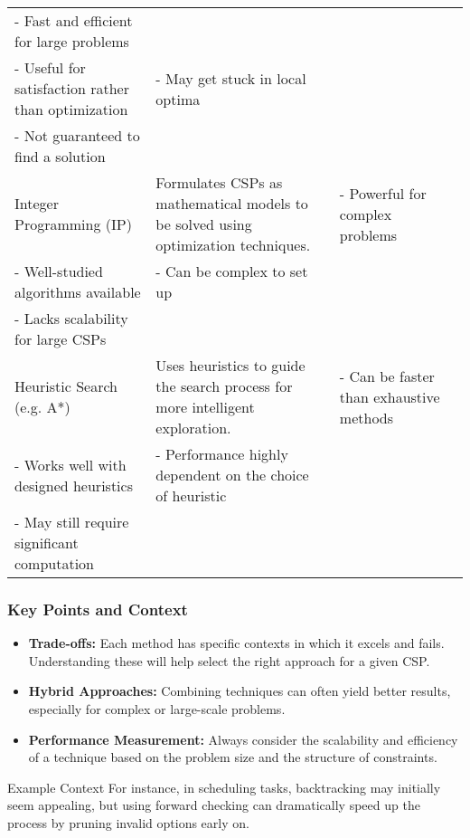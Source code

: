 \documentclass[aspectratio=169]{beamer}
\begin{document}
\begin{frame}[fragile]
\begin{tabular}{|l|l|l|l|}
        - Fast and efficient for large problems \\ - Useful for satisfaction rather than optimization & 
        - May get stuck in local optima \\ - Not guaranteed to find a solution \\
        \hline
        Integer Programming (IP) & Formulates CSPs as mathematical models to be solved using optimization techniques. & 
        - Powerful for complex problems \\ - Well-studied algorithms available & 
        - Can be complex to set up \\ - Lacks scalability for large CSPs \\
        \hline
        Heuristic Search (e.g. A*) & Uses heuristics to guide the search process for more intelligent exploration. & 
        - Can be faster than exhaustive methods \\ - Works well with designed heuristics & 
        - Performance highly dependent on the choice of heuristic \\ - May still require significant computation \\
        \hline
    \end{tabular}
\end{frame}

\begin{frame}[fragile]
    \frametitle{Key Points and Context}
    \begin{itemize}
        \item \textbf{Trade-offs:} Each method has specific contexts in which it excels and fails. Understanding these will help select the right approach for a given CSP.
        \item \textbf{Hybrid Approaches:} Combining techniques can often yield better results, especially for complex or large-scale problems.
        \item \textbf{Performance Measurement:} Always consider the scalability and efficiency of a technique based on the problem size and the structure of constraints.
    \end{itemize}

    \begin{block}{Example Context}
        For instance, in scheduling tasks, backtracking may initially seem appealing, but using forward checking can dramatically speed up the process by pruning invalid options early on.
    \end{block}
\end{frame}
\end{document}
